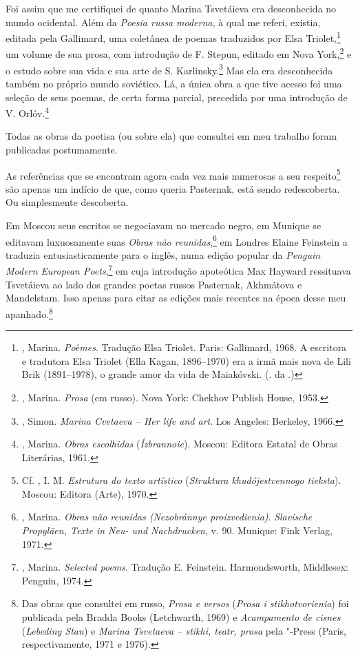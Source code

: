 Foi assim que me certifiquei de quanto Marina Tsvetáieva era
desconhecida no mundo ocidental. Além da \emph{Poesia russa
moderna}, à qual me referi, existia, editada pela Gallimard,
uma coletânea de poemas traduzidos por Elsa Triolet,\footnote{,
Marina. \emph{Poèmes}. Tradução Elsa Triolet. Paris: Gallimard,
1968. A escritora e tradutora Elsa Triolet (Ella Kagan, 1896--1970) era a irmã mais nova de Lili Brik (1891--1978), o grande amor da vida de Maiakóvski. (. da .)} um volume de sua prosa, com introdução de F. Stepun, editado em Nova York,\footnote{, Marina.
\emph{Prosa} (em russo). Nova York: Chekhov Publish House,
1953.} e o estudo sobre sua vida e sua arte de S.
Karlinsky.\footnote{, Simon. \emph{Marina
Cvetaeva -- Her life and art}. Los Angeles: Berkeley, 1966.} Mas
ela era desconhecida também no próprio mundo soviético. Lá, a
única obra a que tive acesso foi uma seleção de seus poemas,
de certa forma parcial, precedida por uma introdução de
V. Orlóv.\footnote{, Marina. \emph{Obras
escolhidas} (\emph{Ízbrannoie}). Moscou: Editora Estatal de
Obras Literárias, 1961.}

Todas as obras da poetisa (ou sobre ela) que consultei em meu
trabalho foram publicadas postumamente.

As referências que se encontram agora cada vez mais numerosas a seu
respeito\footnote{Cf. , I. M. \emph{Estrutura do
texto artístico} (\emph{Struktura khudójestvennogo tieksta}). Moscou:
Editora (Arte), 1970.} são apenas um indício de que, como queria
Pasternak, está sendo redescoberta. Ou simplesmente descoberta.

Em Moscou seus escritos se negociavam no mercado negro, em Munique
se editavam luxuosamente suas \emph{Obras não
reunidas},\footnote{, Marina. \emph{Obras não reunidas (Nezobránnye proizvedienia)}. \emph{Slavische Propyläen, Texte in Neu- und
Nachdrucken}, v. 90. Munique: Fink Verlag, 1971.} em Londres
Elaine Feinstein a traduzia entusiasticamente para o inglês,
numa edição popular da \emph{Penguin Modern European
Poets},\footnote{, Marina. \emph{Selected
poems}. Tradução E. Feinstein. Harmondsworth, Middlesex:
Penguin, 1974.} em cuja introdução apoteótica Max Hayward
ressituava Tsvetáieva ao lado dos grandes poetas russos
Pasternak, Akhmátova e Mandelstam. Isso apenas para citar
as edições mais recentes na época desse meu apanhado.\footnote{Das
obras que consultei em russo, \emph{Prosa e versos} (\emph{Prosa
i stikhotvorienia}) foi publicada pela Bradda Books (Letchwarth,
1969) e \emph{Acampamento de cisnes} (\emph{Lebediny Stan}) e
\emph{Marina Tsvetaeva -- stikhi, teatr, prosa} pela "-Press
(Paris, respectivamente, 1971 e 1976).}

